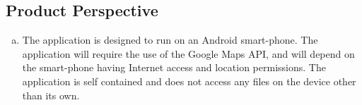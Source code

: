 \documentclass[]{article}
\begin{document}
\subsection{Product Perspective}
\label{sub:product_perspective}
\begin{enumerate}[a)]
	\item The application is designed to run on an Android smart-phone. The application will require the use of the Google Maps API, and will depend on the smart-phone having Internet access and location permissions. The application is self contained and does not access any files on the device other than its own.
\end{enumerate}
\cbend
\end{document}
